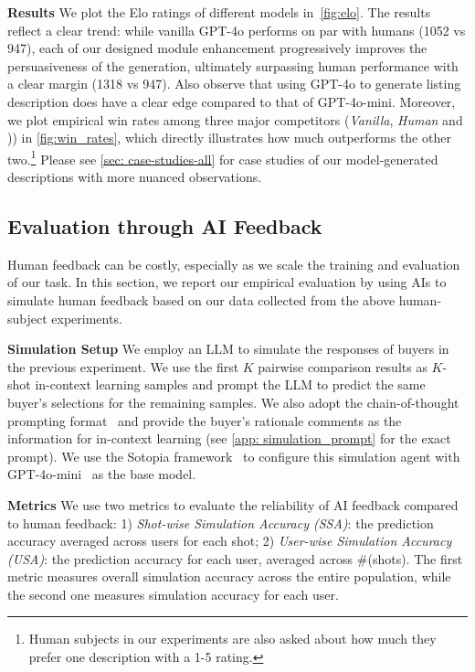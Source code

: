 \textbf{Results}\quad 
We plot the  Elo ratings of different models in~\cref{fig:elo}. The results reflect a clear trend: while vanilla GPT-4o   performs on par with humans (1052 vs 947), each of our designed module enhancement progressively improves the persuasiveness of the generation, ultimately surpassing human performance with a clear margin (1318 vs 947). Also observe that using GPT-4o to generate listing description does have a clear edge compared to that of GPT-4o-mini. Moreover, we plot empirical win rates among three major competitors (\textit{Vanilla}, \textit{Human} and \agentname)) in \cref{fig:win_rates}, which directly illustrates how much \agentname outperforms the other two.\footnote{Human subjects in our experiments are also asked about how much they prefer one description with a 1-5 rating.}
Please see \cref{sec: case-studies-all} for case studies of our model-generated descriptions with more nuanced observations. 

\subsection{Evaluation through AI Feedback}
Human feedback can be costly, especially as we scale the training and evaluation of our task. In this section, we report our empirical evaluation by using AIs to simulate human feedback based on our data collected from the above human-subject experiments.

\textbf{Simulation Setup}\quad 
We employ an LLM to simulate the responses of buyers in the previous experiment. We use the first $K$ pairwise comparison results as $K$-shot in-context learning samples and prompt the LLM to predict the same buyer's selections for the remaining samples. We also adopt the chain-of-thought prompting format~\citep{wei2022chain} and provide the buyer's rationale comments as the information for in-context learning (see \cref{app: simulation_prompt} for the exact prompt). We use the Sotopia framework~\citep{zhou2024sotopia} to configure this simulation agent with GPT-4o-mini~\citep{openai2024gpt4omini} as the base model. 

\textbf{Metrics}\quad 
We use two metrics to evaluate the reliability of AI feedback compared to human feedback: 1) \textit{Shot-wise Simulation Accuracy (SSA)}: the prediction accuracy averaged across users for each shot; 2) \textit{User-wise Simulation Accuracy (USA)}: the prediction accuracy for each user, averaged across \#(shots). The first metric measures overall simulation accuracy across the entire population, while the second one measures simulation accuracy for each user.  

